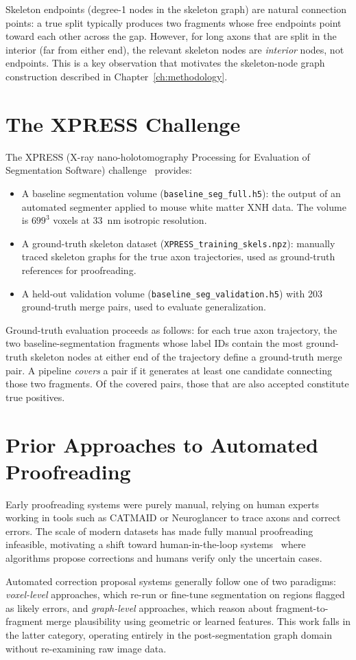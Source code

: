Skeleton endpoints (degree-1 nodes in the skeleton graph) are natural
connection points: a true split typically produces two fragments whose free
endpoints point toward each other across the gap. However, for long axons that
are split in the interior (far from either end), the relevant skeleton nodes are
\emph{interior} nodes, not endpoints. This is a key observation that motivates the
skeleton-node graph construction described in Chapter~\ref{ch:methodology}.

\section{The XPRESS Challenge}

The XPRESS (X-ray nano-holotomography Processing for Evaluation of Segmentation
Software) challenge~\cite{xpress2023} provides:

\begin{itemize}
  \item A baseline segmentation volume (\texttt{baseline\_seg\_full.h5}): the
        output of an automated segmenter applied to mouse white matter XNH data.
        The volume is $699^3$ voxels at 33~nm isotropic resolution.
  \item A ground-truth skeleton dataset (\texttt{XPRESS\_training\_skels.npz}):
        manually traced skeleton graphs for the true axon trajectories, used as
        ground-truth references for proofreading.
  \item A held-out validation volume (\texttt{baseline\_seg\_validation.h5}) with
        203 ground-truth merge pairs, used to evaluate generalization.
\end{itemize}

Ground-truth evaluation proceeds as follows: for each true axon trajectory, the
two baseline-segmentation fragments whose label IDs contain the most ground-truth
skeleton nodes at either end of the trajectory define a ground-truth merge pair.
A pipeline \emph{covers} a pair if it generates at least one candidate connecting
those two fragments. Of the covered pairs, those that are also accepted constitute
true positives.

\section{Prior Approaches to Automated Proofreading}

Early proofreading systems were purely manual, relying on human experts working
in tools such as CATMAID or Neuroglancer to trace axons and correct errors. The
scale of modern datasets has made fully manual proofreading infeasible, motivating
a shift toward human-in-the-loop systems~\cite{dorkenwald2025cave} where
algorithms propose corrections and humans verify only the uncertain cases.

Automated correction proposal systems generally follow one of two paradigms:
\emph{voxel-level} approaches, which re-run or fine-tune segmentation on regions
flagged as likely errors, and \emph{graph-level} approaches, which reason about
fragment-to-fragment merge plausibility using geometric or learned features.
This work falls in the latter category, operating entirely in the post-segmentation
graph domain without re-examining raw image data.
